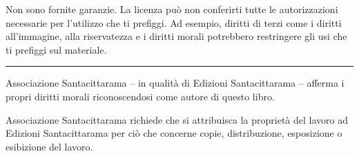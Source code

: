 {Non sono fornite garanzie. La licenza può non conferirti tutte le autorizzazioni
necessarie per l'utilizzo che ti prefiggi. Ad esempio, diritti di terzi come i
diritti all'immagine, alla riservatezza e i diritti morali potrebbero
restringere gli usi che ti prefiggi sul materiale.

{\centering
  \color[gray]{0.4}\rule{0.4\linewidth}{0.1pt}%
\par}

Associazione Santacittarama -- in qualità di Edizioni Santacittarama -- afferma
i propri diritti morali riconoscendosi come autore di questo libro.

Associazione Santacittarama richiede che si attribuisca la proprietà del lavoro
ad Edizioni Santacittarama per ciò che concerne copie, distribuzione,
esposizione o esibizione del lavoro.

}

